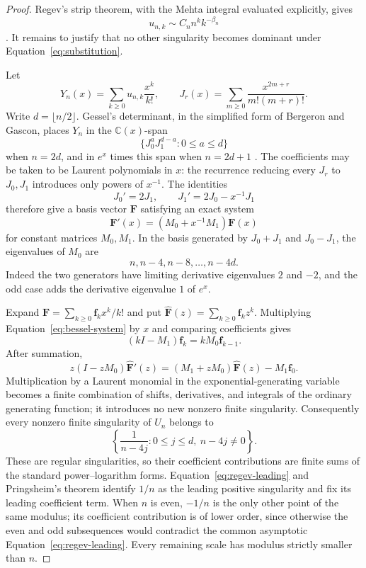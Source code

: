 \documentclass[11pt]{article}
\theoremstyle{definition}
\begin{document}
\begin{proof}
Regev's strip theorem, with the Mehta integral evaluated explicitly, gives
\begin{equation}\label{eq:regev-leading}
 u_{n,k}\sim C_n n^k k^{-\beta_n}
\end{equation}
\cite{Regev1981,Matsumoto2008}.  It remains to justify that no other
singularity becomes dominant under Equation~\eqref{eq:substitution}.

Let
\[
 Y_n(x)=\sum_{k\ge0}u_{n,k}\frac{x^k}{k!},
 \qquad
 J_r(x)=\sum_{m\ge0}\frac{x^{2m+r}}{m!(m+r)!}.
\]
Write $d=\lfloor n/2\rfloor$.  Gessel's determinant, in the simplified form
of Bergeron and Gascon, places $Y_n$ in the $\mathbb C(x)$-span
\[
 \{J_0^aJ_1^{d-a}:0\le a\le d\}
\]
when $n=2d$, and in $e^x$ times this span when $n=2d+1$
\cite{Gessel1990,BergeronGascon2000}.  The coefficients may be taken to be
Laurent polynomials in $x$: the recurrence reducing every $J_r$ to $J_0,J_1$
introduces only powers of $x^{-1}$.  The identities
\[
 J_0'=2J_1,
 \qquad
 J_1'=2J_0-x^{-1}J_1
\]
therefore give a basis vector $\mathbf F$ satisfying an exact system
\begin{equation}\label{eq:bessel-system}
 \mathbf F'(x)=(M_0+x^{-1}M_1)\mathbf F(x)
\end{equation}
for constant matrices $M_0,M_1$.  In the basis generated by
$J_0+J_1$ and $J_0-J_1$, the eigenvalues of $M_0$ are
\begin{equation}\label{eq:bessel-scales}
 n,n-4,n-8,\ldots,n-4d.
\end{equation}
Indeed the two generators have limiting derivative eigenvalues $2$ and
$-2$, and the odd case adds the derivative eigenvalue $1$ of $e^x$.

Expand $\mathbf F=\sum_{k\ge0}\mathbf f_kx^k/k!$ and put
$\widehat{\mathbf F}(z)=\sum_{k\ge0}\mathbf f_kz^k$.  Multiplying
Equation~\eqref{eq:bessel-system} by $x$ and comparing coefficients gives
\[
 (kI-M_1)\mathbf f_k=kM_0\mathbf f_{k-1}.
\]
After summation,
\begin{equation}\label{eq:ordinary-bessel-system}
 z(I-zM_0)\widehat{\mathbf F}'(z)
 =(M_1+zM_0)\widehat{\mathbf F}(z)-M_1\mathbf f_0.
\end{equation}
Multiplication by a Laurent monomial in the exponential-generating variable
becomes a finite combination of shifts, derivatives, and integrals of the
ordinary generating function; it introduces no new nonzero finite
singularity.  Consequently every nonzero finite singularity of $U_n$ belongs to
\[
 \left\{\frac1{n-4j}:0\le j\le d,\ n-4j\ne0\right\}.
\]
These are regular singularities, so their coefficient contributions are
finite sums of the standard power--logarithm forms.
Equation~\eqref{eq:regev-leading} and Pringsheim's theorem identify $1/n$ as
the leading positive singularity and fix its leading coefficient term.
When $n$ is even, $-1/n$ is the only other point of the same modulus; its
coefficient contribution is of lower order, since otherwise the even and
odd subsequences would contradict the common asymptotic
Equation~\eqref{eq:regev-leading}.  Every remaining scale has modulus
strictly smaller than $n$.


\end{proof}
\end{document}
